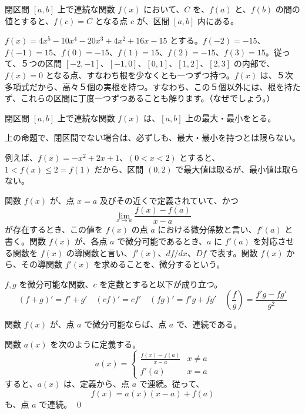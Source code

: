 \begin{prop}   \label{prop:inter}
閉区間 $[a,b]$ 上で連続な関数 $f(x)$ において、$C$ を、$f(a)$ と、$f(b)$ の間の値とすると、$f(c) = C$ となる点 $c$ が、区間 $[a,b]$ 内にある。
\end{prop}

\begin{eg}
$f(x) = 4x^5 - 10x^4 - 20x^3 + 4x^2 + 16x - 15$ とする。$f(-2) = -15$、$f(-1) = 15$、$f(0) = -15$、$f(1) = 15$、$f(2) = -15$、$f(3) = 15$。従って、５つの区間 $[-2,-1]$、$[-1,0]$、$[0,1]$、$[1,2]$、$[2,3]$ の内部で、$f(x) = 0$ となる点、すなわち根を少なくとも一つずつ持つ。$f(x)$ は、５次多項式だから、高々５個の実根を持つ。すなわち、この５個以外には、根を持たず、これらの区間に丁度一つずつあることも解ります。（なぜでしょう。）
\end{eg}

\begin{prop}  \label{prop:maxmin}
閉区間 $[a,b]$ 上で連続な関数 $f(x)$ は、$[a,b]$ 上の最大・最小をとる。
\end{prop}

\note 上の命題で、閉区間でない場合は、必ずしも、最大・最小を持つとは限らない。

例えば、$f(x) = -x^2 + 2x + 1$、$(0 < x < 2)$ とすると、$1 < f(x) \leq 2 = f(1)$ だから、区間 $(0,2)$ で最大値は取るが、最小値は取らない。

\newpage
{}
\begin{definition}
関数 $f(x)$ が、点 $x = a$ 及びその近くで定義されていて、かつ
$$\lim_{x\rightarrow a}\frac{f(x)-f(a)}{x-a}$$
が存在するとき、この値を $f(x)$ の点 $a$ における微分係数と言い、$f'(a)$ と書く。関数 $f(x)$ が、各点 $a$ で微分可能であるとき、$a$ に $f'(a)$ を対応させる関数を $f(x)$ の導関数と言い、$f'(x)$、$df/dx$、$Df$ で表す。関数 $f(x)$ から、その導関数 $f'(x)$ を求めることを、微分するという。
\end{definition}

\begin{eg} 
$f, g$  を微分可能な関数、$c$ を定数とすると以下が成り立つ。
$$(f + g)' = f' + g'\quad (cf)' = cf'\quad (fg)' = f'g + fg'\quad \left(\frac{f}{g}\right) = \frac{f'g - fg'}{g^2}$$
\end{eg}

\begin{prop}
関数 $f(x)$ が、点 $a$ で微分可能ならば、点 $a$ で、連続である。
\end{prop}
\proof
関数 $a(x)$ を次のように定義する。
$$a(x) = \left\{\begin{array}{ll}
\displaystyle{\frac{f(x)-f(a)}{x-a}} & x\neq a\\ f'(a) & x = a
\end{array}\right.$$
すると、$a(x)$ は、定義から、点 $a$ で連続。従って、
$$f(x) = a(x)(x-a) + f(a)$$
も、点 $a$ で連続。
\qed

